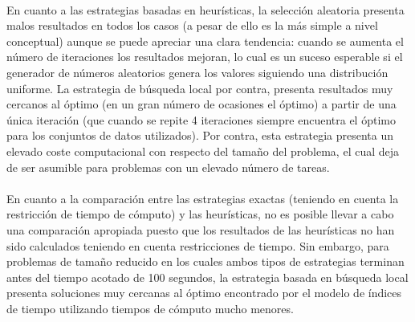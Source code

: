 \documentclass[spanish]{article}
\begin{document}
		\paragraph{}
		En cuanto a las estrategias basadas en heurísticas, la selección aleatoria presenta malos resultados en todos los casos (a pesar de ello es la más simple a nivel conceptual) aunque se puede apreciar una clara tendencia: cuando se aumenta el número de iteraciones los resultados mejoran, lo cual es un suceso esperable si el generador de números aleatorios genera los valores siguiendo una distribución uniforme. La estrategia de búsqueda local por contra, presenta resultados muy cercanos al óptimo (en un gran número de ocasiones el óptimo) a partir de una única iteración (que cuando se repite 4 iteraciones siempre encuentra el óptimo para los conjuntos de datos utilizados). Por contra, esta estrategia presenta un elevado coste computacional con respecto del tamaño del problema, el cual deja de ser asumible para problemas con un elevado número de tareas.

		\paragraph{}
		En cuanto a la comparación entre las estrategias exactas (teniendo en cuenta la restricción de tiempo de cómputo) y las heurísticas, no es posible llevar a cabo una comparación apropiada puesto que los resultados de las heurísticas no han sido calculados teniendo en cuenta restricciones de tiempo. Sin embargo, para problemas de tamaño reducido en los cuales ambos tipos de estrategias terminan antes del tiempo acotado de 100 segundos, la estrategia basada en búsqueda local presenta soluciones muy cercanas al óptimo encontrado por el modelo de índices de tiempo utilizando tiempos de cómputo mucho menores.

	\nocite{subject:mio}
	\nocite{garciparedes:mosel-examples}
	\nocite{tool:xpress-mosel}
	\nocite{tool:neos-server}
	
  
\end{document}
